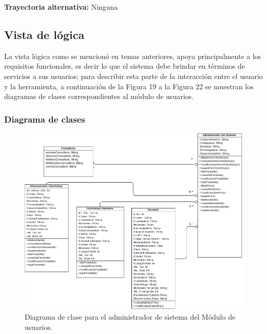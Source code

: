 \textbf{Trayectoria  alternativa:}  Ninguna





\newpage
\subsection{Vista de lógica}
La vista lógica como se mencionó en temas anteriores, apoya principalmente a los requisitos funcionales, es decir lo que el sistema debe brindar en términos de servicios a sus usuarios; para describir esta parte de la interacción entre el usuario y la herramienta, a continuación de la Figura 19 a la Figura 22 se muestran los diagramas de clases correspondientes al módulo de usuarios.
\subsubsection{Diagrama de clases}
\begin{figure}[H]
\centering
\includegraphics[width=16cm,keepaspectratio]{pictures/DiagramaClase_AdminSis_Prototipo1.png}
\caption{Diagrama de clase para el administrador de sistema del Módulo de usuarios.}
\end{figure}

